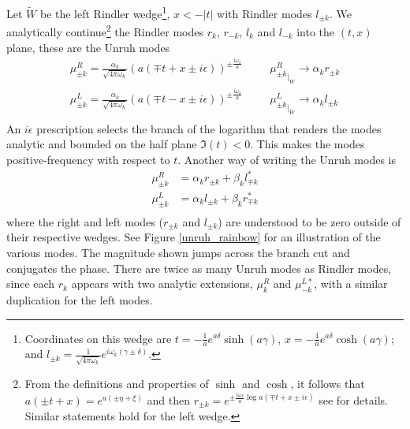 \documentclass[12pt,a4paper]{article}
\begin{document}
Let $\widetilde{W}$ be the left Rindler wedge\footnote{Coordinates on this wedge are $t = -\frac{1}{a}e^{a\delta} \sinh(a\gamma)$, $x = -\frac{1}{a}e^{a\delta} \cosh(a\gamma)$; and $l_{\pm k} = \frac{1}{\sqrt{4 \pi \omega_k}} e^{i\omega_k(\gamma \pm \delta)}$.}, $x < -|t|$ with Rindler modes $l_{\pm k}$.  We analytically continue\footnote{From the definitions and properties of $\sinh$ and $\cosh$, it follows that $a(\pm t + x) = e^{a(\pm \eta + \xi)}$ and then $r_{\pm k} = e^{\pm \frac{i \omega_k}{a}\log a(\mp t + x \pm i\epsilon)}$ see \cite{frodden2018unruh} for details.  Similar statements hold for the left wedge.} the Rindler modes $r_k$, $r_{-k}$, $l_k$ and $l_{-k}$ into the $(t,x)$ plane, these are the Unruh modes
\begin{equation}
  \begin{array}{ll}
    \mu^R_{\pm k} = \frac{\alpha_k }{\sqrt{4 \pi \omega_k}} (a(\mp t + x \pm  i \epsilon))^{\pm \frac{i \omega_k}{a}} & \hspace{20pt}
       {\mu^R_{\pm k}}_{|_W} \rightarrow \alpha_k r_{\pm k} \\
    \mu^L_{\pm k} =  \frac{\alpha_k}{\sqrt{4 \pi \omega_k}} (a(\mp t - x \pm  i \epsilon))^{\pm \frac{i \omega_k}{a}} & \hspace{20pt}
    {\mu^L_{\pm k}}_{|_{\widetilde{W}}} \rightarrow \alpha_k l_{\pm k} \\
  \end{array}
  \label{rindler_mode_def}
\end{equation}
An $i \epsilon$ prescription selects the branch of the logarithm that renders the modes analytic and bounded on the half plane $\mathfrak{I}(t)<0$. This makes the modes positive-frequency with respect to $t$.  Another way of writing the Unruh modes is
\begin{equation}
\begin{aligned}
  \mu^R_{\pm k} &= \alpha_k r_{\pm k} + \beta_k l^*_{\mp k} \\
  \mu^L_{\pm k} &= \alpha_k l_{\pm k} + \beta_k r^*_{\mp k} \\
\end{aligned}
\label{unruh_mode_def}
\end{equation}
where the right and left modes ($r_{\pm k}$ and $l_{\pm k}$) are understood to be zero outside of their respective wedges. See Figure \ref{unruh_rainbow} for an illustration of the various modes. The magnitude shown jumps across the branch cut and conjugates the phase. There are twice as many Unruh modes as Rindler modes, since each $r_k$ appears with two analytic extensions, $\mu^R_k$ and $\mu^{L*}_{-k}$, with a similar duplication for the left modes.
\end{document}
